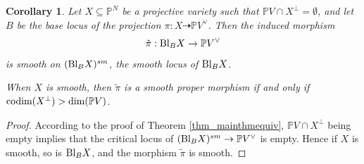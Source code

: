 \documentclass[12pt]{amsart}
\newtheorem{corollary}[theorem]{Corollary}
\begin{document}
\begin{corollary}\label{cor_smooth-fibration}
Let $X \subseteq \mathbb{P}^N$ be a projective variety such that $\mathbb{P}V \cap X^\perp = \emptyset$, and let $B$ be the base locus of the projection $\pi: X \dashrightarrow \mathbb{P}V^\vee$. Then the induced morphism $$\tilde{\pi}: \textup{Bl}_BX \to \mathbb{P}V^\vee$$ is smooth on $(\textup{Bl}_BX)^{sm}$, the smooth locus of $\textup{Bl}_BX$. 

When $X$ is smooth, then $\tilde{\pi}$ is a smooth proper morphism if and only if $\textup{codim}(X^{\perp })>\dim(\mathbb PV)$.
\end{corollary}
\begin{proof}
    According to the proof of Theorem \ref{thm_mainthmequiv}, $\mathbb PV\cap X^{\perp}$ being empty implies that the critical locus of $(\textup{Bl}_BX)^{sm}\to \mathbb PV^{\vee}$ is empty. Hence if $X$ is smooth, so is $\textup{Bl}_BX$, and the morphism $\tilde{\pi}$ is smooth. %
\end{proof}
\end{document}
